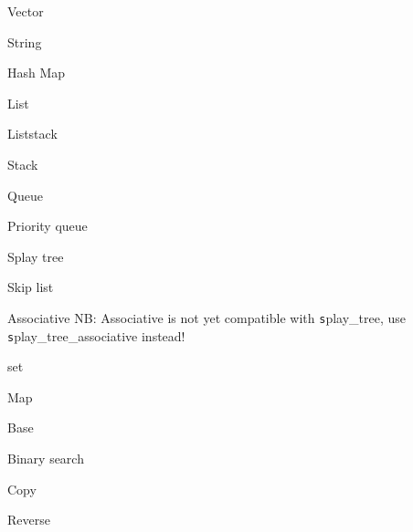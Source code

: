 \begin{algorithm}{Vector}
\end{algorithm}
\begin{algorithm}{String}
\end{algorithm}
\begin{algorithm}{Hash Map}
\end{algorithm}
\begin{algorithm}{List}
\end{algorithm}
\begin{algorithm}{Liststack}
\end{algorithm}
\begin{algorithm}{Stack}
\end{algorithm}
\begin{algorithm}{Queue}
\end{algorithm}
\begin{algorithm}{Priority queue}
\end{algorithm}
\begin{algorithm}{Splay tree}
\end{algorithm}
\begin{algorithm}{Skip list}
\end{algorithm}
\begin{algorithm}{Associative}
NB: Associative is not yet compatible with {\texttt splay\_tree}, use
{\texttt splay\_tree\_associative} instead!
\end{algorithm}
\begin{algorithm}{set}
\end{algorithm}
\begin{algorithm}{Map}
\end{algorithm}
\begin{algorithm}{Base}
\end{algorithm}
\begin{algorithm}{Binary search}
\end{algorithm}
\begin{algorithm}{Copy}
\end{algorithm}
\begin{algorithm}{Reverse}
\end{algorithm}
